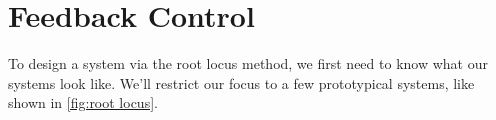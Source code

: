 \section{Feedback Control}
To design a system via the root locus method, we first need to know what our systems look like. We'll restrict our focus to a few prototypical systems, like shown in \autoref{fig:root locus}.
\begin{figure}[ht]
    \centering




\begin{tikzpicture}[x=0.75pt,y=0.75pt,yscale=-1,xscale=1]


\end{tikzpicture}
\end{figure}
